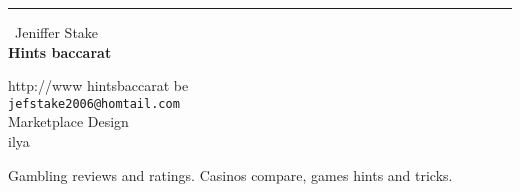 \documentclass{report}
\begin{document}
\begin{center}
\rule{6in}{1pt} \
{\large Jeniffer Stake \\
{\bf Hints baccarat}}

http://www hintsbaccarat be
\\
{\tt jefstake2006@homtail.com}\\
 Marketplace Design\\
	ilya\end{center}

Gambling reviews and ratings. Casinos compare, games hints and tricks.
\end{document}
